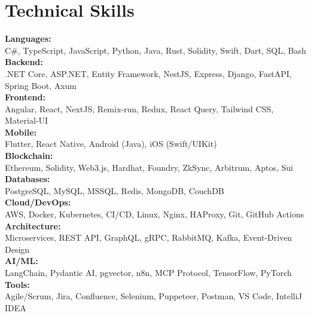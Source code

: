 \section{Technical Skills}
 \begin{itemize}[leftmargin=0.15in, label={}]
    \small{\item{
     \textbf{Languages:} \\
     \quad \textbullet{} C\#, TypeScript, JavaScript, Python, Java, Rust, Solidity, Swift, Dart, SQL, Bash \\ \vspace{2pt}
     \textbf{Backend:} \\
     \quad \textbullet{} .NET Core, ASP.NET, Entity Framework, NestJS, Express, Django, FastAPI, Spring Boot, Axum \\ \vspace{2pt}
     \textbf{Frontend:} \\
     \quad \textbullet{} Angular, React, NextJS, Remix-run, Redux, React Query, Tailwind CSS, Material-UI \\ \vspace{2pt}
     \textbf{Mobile:} \\
     \quad \textbullet{} Flutter, React Native, Android (Java), iOS (Swift/UIKit) \\ \vspace{2pt}
     \textbf{Blockchain:} \\
     \quad \textbullet{} Ethereum, Solidity, Web3.js, Hardhat, Foundry, ZkSync, Arbitrum, Aptos, Sui \\ \vspace{2pt}
     \textbf{Databases:} \\
     \quad \textbullet{} PostgreSQL, MySQL, MSSQL, Redis, MongoDB, CouchDB \\ \vspace{2pt}
     \textbf{Cloud/DevOps:} \\
     \quad \textbullet{} AWS, Docker, Kubernetes, CI/CD, Linux, Nginx, HAProxy, Git, GitHub Actions \\ \vspace{2pt}
     \textbf{Architecture:} \\
     \quad \textbullet{} Microservices, REST API, GraphQL, gRPC, RabbitMQ, Kafka, Event-Driven Design \\ \vspace{2pt}
     \textbf{AI/ML:} \\
     \quad \textbullet{} LangChain, Pydantic AI, pgvector, n8n, MCP Protocol, TensorFlow, PyTorch \\ \vspace{2pt}
     \textbf{Tools:} \\
     \quad \textbullet{} Agile/Scrum, Jira, Confluence, Selenium, Puppeteer, Postman, VS Code, IntelliJ IDEA
    }}
 \end{itemize}